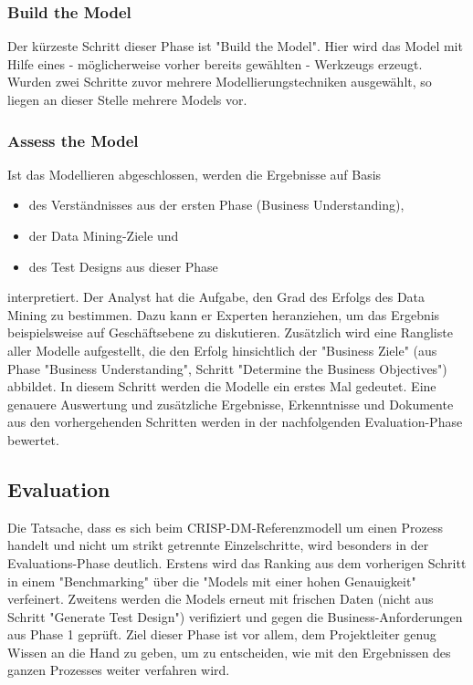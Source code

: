 \subsubsection{Build the Model}
Der kürzeste Schritt dieser Phase ist "Build the Model". Hier wird das Model mit Hilfe eines - möglicherweise vorher bereits gewählten - Werkzeugs erzeugt. Wurden zwei Schritte zuvor mehrere Modellierungstechniken ausgewählt, so liegen an dieser Stelle mehrere Models vor.

\subsubsection{Assess the Model}
Ist das Modellieren abgeschlossen, werden die Ergebnisse auf Basis 
\begin{itemize}
\item des Verständnisses aus der ersten Phase (Business Understanding),
\item der Data Mining-Ziele und
\item des Test Designs aus dieser Phase
\end{itemize}
interpretiert. Der Analyst hat die Aufgabe, den Grad des Erfolgs des Data Mining zu bestimmen. Dazu kann er Experten heranziehen, um das Ergebnis beispielsweise auf Geschäftsebene zu diskutieren. Zusätzlich wird eine Rangliste aller Modelle aufgestellt, die den Erfolg hinsichtlich der "Business Ziele" (aus Phase "Business Understanding", Schritt "Determine the Business Objectives") abbildet. \newline
In diesem Schritt werden die Modelle ein erstes Mal gedeutet. Eine genauere Auswertung und zusätzliche Ergebnisse, Erkenntnisse und Dokumente aus den vorhergehenden Schritten werden in der nachfolgenden Evaluation-Phase bewertet.\citep[S.25]{chapman_crisp-dm_2000}


\subsection{Evaluation}
Die Tatsache, dass es sich beim CRISP-DM-Referenzmodell um einen Prozess handelt und nicht um strikt getrennte Einzelschritte, wird besonders in der Evaluations-Phase deutlich. Erstens wird das Ranking aus dem vorherigen Schritt in einem "Benchmarking" über die "Models mit einer hohen Genauigkeit"\citep[S.~73; eigene Übersetzung]{swamynathan_mastering_2017} verfeinert. Zweitens werden die Models erneut mit frischen Daten (nicht aus Schritt "Generate Test Design") verifiziert und gegen die Business-Anforderungen aus Phase 1 geprüft.\citep[S.~73]{swamynathan_mastering_2017} Ziel dieser Phase ist vor allem, dem Projektleiter genug Wissen an die Hand zu geben, um zu entscheiden, wie mit den Ergebnissen des ganzen Prozesses weiter verfahren wird. 

